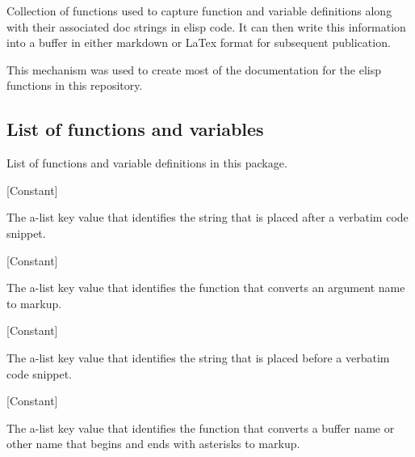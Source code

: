 Collection of functions used to capture function and variable definitions
along with their associated doc strings in elisp code.  It can then write
this information into a buffer in either markdown or LaTex format for
subsequent publication.

This mechanism was used to create most of the documentation for the elisp
functions in this repository.


\subsection{List of functions and variables}

List of functions and variable definitions in this package.



\vspace{1em}
\noindent
{}
\usebox{\funcname}
 \hfill [Constant]

\begin{doc-string}
The a-list key value that identifies the string that is placed after a verbatim
code snippet.
\end{doc-string}

\vspace{1em}
\noindent
{}
\usebox{\funcname}
 \hfill [Constant]

\begin{doc-string}
The a-list key value that identifies the function that converts an argument name
to markup.
\end{doc-string}

\vspace{1em}
\noindent
{}
\usebox{\funcname}
 \hfill [Constant]

\begin{doc-string}
The a-list key value that identifies the string that is placed before a verbatim
code snippet.
\end{doc-string}

\vspace{1em}
\noindent
{}
\usebox{\funcname}
 \hfill [Constant]

\begin{doc-string}
The a-list key value that identifies the function that converts a buffer name or
other name that begins and ends with asterisks to markup.
\end{doc-string}

